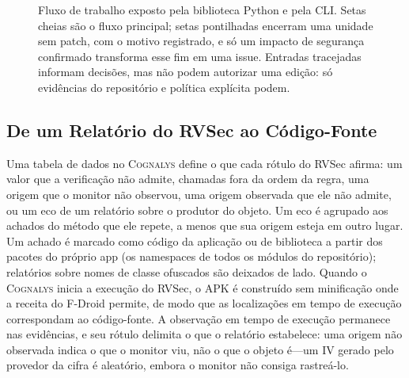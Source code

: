 \documentclass[conference]{IEEEtran}
\newcommand{\system}{\textsc{Cognalys}}
\begin{document}
\begin{figure}[t]
{
}
\caption{Fluxo de trabalho exposto pela biblioteca Python e pela CLI. Setas
cheias são o fluxo principal; setas pontilhadas encerram uma unidade sem patch,
com o motivo registrado, e só um impacto de segurança confirmado transforma esse
fim em uma issue. Entradas tracejadas informam decisões, mas não podem autorizar
uma edição: só evidências do repositório e política explícita podem.}
\label{fig:pipeline}
\end{figure}

\subsection{De um Relatório do RVSec ao Código-Fonte}

Uma tabela de dados no \system{} define o que cada rótulo do RVSec afirma: um
valor que a verificação não admite, chamadas fora da ordem da regra, uma origem
que o monitor não observou, uma origem observada que ele não admite, ou um eco
de um relatório sobre o produtor do objeto. Um eco é agrupado aos achados do
método que ele repete, a menos que sua origem esteja em outro lugar. Um achado
é marcado como código da aplicação ou de biblioteca a partir dos pacotes do
próprio app (os namespaces de todos os módulos do repositório); relatórios
sobre nomes de classe ofuscados são deixados de lado. Quando o \system{} inicia
a execução do RVSec, o APK é construído sem minificação onde a receita do
F-Droid permite, de modo que as localizações em tempo de execução correspondam
ao código-fonte. A observação em tempo de execução permanece nas evidências, e
seu rótulo delimita o que o relatório estabelece: uma origem não observada
indica o que o monitor viu, não o que o objeto é---um IV gerado pelo provedor
da cifra é aleatório, embora o monitor não consiga rastreá-lo.
\end{document}
